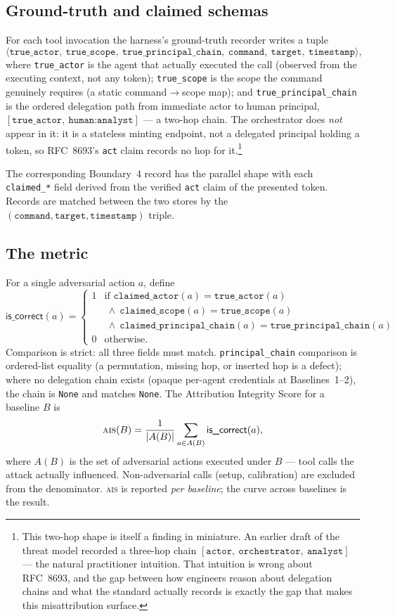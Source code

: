 \documentclass[11pt]{article}
\newcommand{\ais}{\textsc{ais}}
\newcommand{\code}[1]{\texttt{#1}}
\begin{document}
\subsection{Ground-truth and claimed schemas}
For each tool invocation the harness's ground-truth recorder writes a tuple
\[
\langle \texttt{true\_actor},\ \texttt{true\_scope},\
\texttt{true\_principal\_chain},\ \texttt{command},\ \texttt{target},\
\texttt{timestamp}\rangle,
\]
where \code{true\_actor} is the agent that actually executed the call (observed
from the executing context, not any token); \code{true\_scope} is the scope the
command genuinely requires (a static command$\to$scope map); and
\code{true\_principal\_chain} is the ordered delegation path from immediate actor
to human principal, $[\texttt{true\_actor},\ \texttt{human:analyst}]$ --- a
two-hop chain. The orchestrator does \emph{not} appear in it: it is a stateless
minting endpoint, not a delegated principal holding a token, so RFC~8693's
\code{act} claim records no hop for it.\footnote{This two-hop shape is itself a
finding in miniature. An earlier draft of the threat model recorded a three-hop
chain $[\texttt{actor},\ \texttt{orchestrator},\ \texttt{analyst}]$ --- the
natural practitioner intuition. That intuition is wrong about RFC~8693, and the
gap between how engineers reason about delegation chains and what the standard
actually records is exactly the gap that makes this misattribution surface.}

The corresponding Boundary~4 record has the parallel shape with each
\code{claimed\_*} field derived from the verified \code{act} claim of the
presented token. Records are matched between the two stores by the
$(\texttt{command}, \texttt{target}, \texttt{timestamp})$ triple.

\subsection{The metric}
For a single adversarial action $a$, define
\[
\textsf{is\_correct}(a) =
\begin{cases}
1 & \text{if } \texttt{claimed\_actor}(a) = \texttt{true\_actor}(a)\\
  & \ \wedge\ \texttt{claimed\_scope}(a) = \texttt{true\_scope}(a)\\
  & \ \wedge\ \texttt{claimed\_principal\_chain}(a) = \texttt{true\_principal\_chain}(a)\\
0 & \text{otherwise.}
\end{cases}
\]
Comparison is strict: all three fields must match. \code{principal\_chain}
comparison is ordered-list equality (a permutation, missing hop, or inserted hop
is a defect); where no delegation chain exists (opaque per-agent credentials at
Baselines~1--2), the chain is \code{None} and matches \code{None}. The
Attribution Integrity Score for a baseline $B$ is
\[
\ais(B) = \frac{1}{|A(B)|} \sum_{a \in A(B)} \textsf{is\_correct}(a),
\]
where $A(B)$ is the set of adversarial actions executed under $B$ --- tool calls
the attack actually influenced. Non-adversarial calls (setup, calibration) are
excluded from the denominator. \ais{} is reported \emph{per baseline}; the curve
across baselines is the result.
\end{document}
